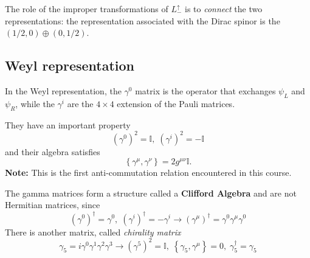
The role of the improper transformations of $L^\uparrow_-$ is to \textit{connect}
the two representations: the representation associated with the Dirac spinor
is the $(1/2,0)\oplus(0,1/2)$.
\subsection{Weyl representation}
In the Weyl representation, the $\gamma^0$ matrix is the operator that exchanges
$\psi_L$ and $\psi_R$, while the $\gamma^i$ are the $4\times 4$ extension of
the Pauli matrices.

They have an important property
$$(\gamma^0)^2=\mathbb{I},\; \left(\gamma^i\right)^2 = -\mathbb{I}$$
and their algebra satisfies
$$\left\{\gamma^\mu,\gamma^\nu\right\} = 2 g^{\mu\nu}\mathbb{I}.$$
\textbf{Note:} This is the first anti-commutation relation encountered in this
course.

The gamma matrices form a structure called a \textbf{Clifford Algebra} and are
not Hermitian matrices, since
$$\left(\gamma^0\right)^\dagger = \gamma^0,\; \left(\gamma^i\right)^\dagger =
-\gamma^i \longrightarrow \left(\gamma^\mu\right)^\dagger =
\gamma^0\gamma^\mu\gamma^0$$
There is another matrix, called \textit{chirality matrix}
$$\gamma_5 = i\gamma^0\gamma^1\gamma^2\gamma^3 \longrightarrow
(\gamma^5)^2=\mathbb{I},\; \left\{\gamma_5,\gamma^\mu\right\} = 0,\;
\gamma_5^\dagger = \gamma_5$$
